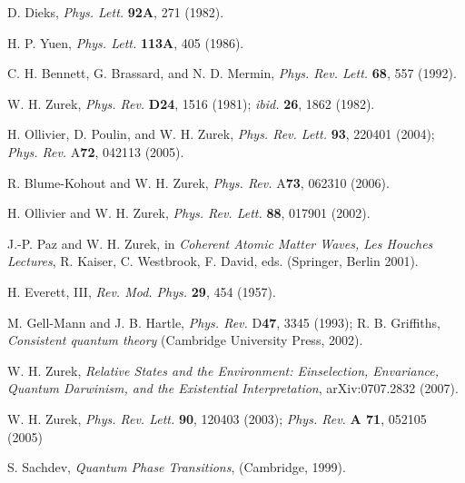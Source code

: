 \documentclass[aps,twocolumn,pra,onecolumn,12pt]{revtex4}
\newcommand{\+}         {\dagger}
\begin{document}
\noindent [12] D. Dieks, {\it Phys. Lett.} {\bf 92A}, 271 (1982).

\noindent [13] H. P. Yuen, {\it Phys. Lett.} {\bf 113A}, 405 (1986).

\noindent [14] C. H. Bennett, G. Brassard, and N. D. Mermin, {\it Phys. Rev. Lett.} {\bf 68}, 557 (1992).

\noindent [15] W. H. Zurek, {\it Phys. Rev.} {\bf D24}, 1516 (1981); {\em ibid.} {\bf 26}, 1862 (1982).

\noindent [16] H. Ollivier, D. Poulin, and W. H. Zurek, {\it Phys. Rev. Lett.} {\bf 93}, 220401 (2004); {\it Phys. Rev.} A{\bf 72}, 042113 (2005).

\noindent [17] R. Blume-Kohout and W. H. Zurek, {\it Phys. Rev.} A{\bf 73}, 062310 (2006).

\noindent [18] H. Ollivier and W. H. Zurek, {\it Phys. Rev. Lett.} {\bf 88}, 017901 (2002).

\noindent [19] J.-P. Paz and W. H. Zurek, in {\it Coherent Atomic Matter Waves, Les Houches Lectures}, R. Kaiser, C. Westbrook, F. David, eds. (Springer, Berlin 2001).

\noindent [20] H. Everett, III, {\it Rev. Mod. Phys.} {\bf 29}, 454 (1957).

\noindent [21] M. Gell-Mann and J. B. Hartle, {\it Phys. Rev.} D{\bf 47}, 3345 (1993); R. B. Griffiths,  
{\it Consistent quantum theory} (Cambridge University Press, 2002).

\noindent [22] W. H. Zurek, {\it Relative States and the Environment: Einselection, Envariance, Quantum Darwinism, and the Existential Interpretation}, arXiv:0707.2832 (2007).

\noindent [23] W. H. Zurek, {\it Phys. Rev. Lett.} {\bf 90}, 120403 (2003); {\it Phys. Rev.} {\bf A 71}, 052105 (2005)



\noindent [24] S. Sachdev, {\it Quantum Phase Transitions}, (Cambridge, 1999).
\end{document}
